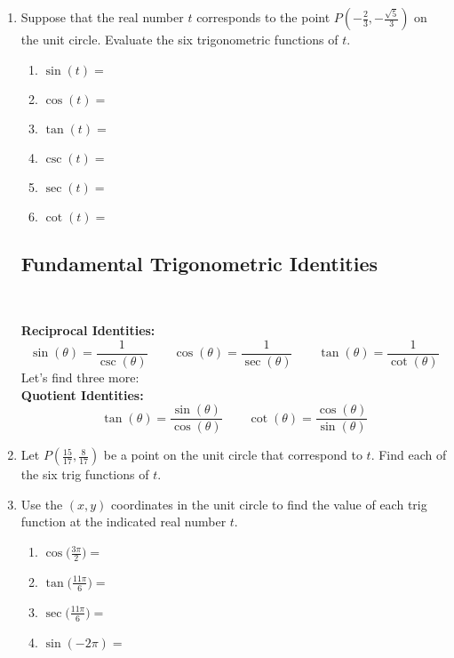 \begin{enumerate}
\item Suppose that the real number $t$ corresponds to the point $P(-\frac{2}{3},-\frac{\sqrt{5}}{3})$ on the unit circle.  Evaluate the six trigonometric functions of $t$.
\begin{enumerate}
\item $\sin(t)=$\\[.5in]
\item $\cos(t)=$ \\[.5in]
\item $\tan(t)=$ \\[.5in]
\item $\csc(t)=$ \\[.5in]
\item $\sec(t)=$ \\[.5in]
\item $\cot(t)=$ \\[.5in]
\end{enumerate}

\subsection{Fundamental Trigonometric Identities} ~

\textbf{Reciprocal Identities:  }
$$\sin(\theta)=\frac{1}{\csc(\theta)} \quad \quad \cos(\theta)=\frac{1}{\sec(\theta)} \quad \quad \tan(\theta)=\frac{1}{\cot(\theta)}$$
Let's find three more:\\[.2in]

\textbf{Quotient Identities:  }
$$\tan(\theta)=\frac{\sin(\theta)}{\cos(\theta)} \quad \quad \cot(\theta)=\frac{\cos(\theta)}{\sin(\theta)}$$

\item Let $P(\frac{15}{17}, \frac{8}{17})$ be a point on the unit circle that correspond to $t$.  Find each of the six trig functions of $t$.\\[1.7in]

\item Use the $(x,y)$ coordinates in the unit circle to find the value of each trig function at the indicated real number $t$.\\

\begin{enumerate}
\item $\displaystyle \cos\Big(\frac{3\pi}{2}\Big)=$\\[.2in]
\item $\displaystyle \tan\Big(\frac{11\pi}{6}\Big)=$\\[.5in]
\item $\displaystyle \sec\Big(\frac{11\pi}{6}\Big)=$\\[.5in]
\item $\displaystyle \sin(-2\pi)=$\\[.2in]
\end{enumerate}


\end{enumerate}
